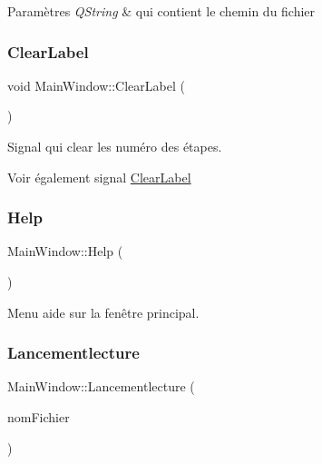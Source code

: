 \begin{DoxyParams}{Paramètres}
{\em Q\+String} & qui contient le chemin du fichier \\
\hline
\end{DoxyParams}
\mbox{\label{class_main_window_a9a0c33e6e696ffc763560205f992650d}} 
\subsubsection{\texorpdfstring{Clear\+Label}{ClearLabel}}
{\footnotesize\ttfamily void Main\+Window\+::\+Clear\+Label (\begin{DoxyParamCaption}{ }\end{DoxyParamCaption})\hspace{0.3cm}{\ttfamily [signal]}}



Signal qui clear les numéro des étapes. 

\begin{DoxySeeAlso}{Voir également}
signal \hyperlink{class_main_window_a9a0c33e6e696ffc763560205f992650d}{Clear\+Label} 
\end{DoxySeeAlso}
\mbox{\label{class_main_window_a25ec89113c14218717cfade9a58f8fdb}} 
\subsubsection{\texorpdfstring{Help}{Help}}
{\footnotesize\ttfamily Main\+Window\+::\+Help (\begin{DoxyParamCaption}{ }\end{DoxyParamCaption})\hspace{0.3cm}{\ttfamily [slot]}}



Menu aide sur la fenêtre principal. 

\mbox{\label{class_main_window_ac368dfd7e2609f0cb72fc1428771aa97}} 
\subsubsection{\texorpdfstring{Lancementlecture}{Lancementlecture}}
{\footnotesize\ttfamily Main\+Window\+::\+Lancementlecture (\begin{DoxyParamCaption}\item[{Q\+String}]{nom\+Fichier }\end{DoxyParamCaption})\hspace{0.3cm}{\ttfamily [slot]}}



